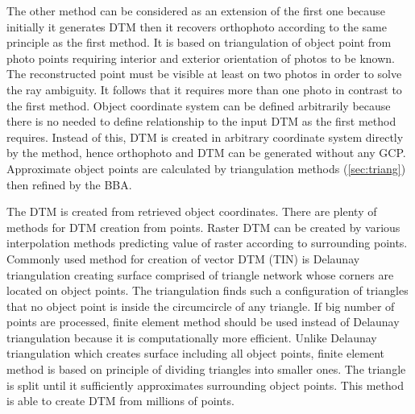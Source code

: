 \documentclass[a4paper,12pt]{article}
\begin{document}

The other method can be considered as an extension of the first one because initially it generates DTM then it recovers orthophoto 
according to the same principle as the first method. It is based on triangulation of object point
from photo points requiring interior and exterior orientation of photos to be known. The reconstructed point 
must be visible at least on two photos in order to solve the ray ambiguity. It follows that it requires more than 
one photo in contrast to the first method.
Object coordinate system 
can be defined arbitrarily because there is no needed to define relationship to the input DTM as the first method requires.
Instead of this, DTM is created in arbitrary coordinate system directly by the method,
hence orthophoto and DTM can be generated without any GCP. 
Approximate object points  are calculated by triangulation 
methods (\ref{sec:triang}) then refined by the BBA. 

The DTM is created from retrieved object coordinates. There 
are plenty of methods for DTM creation from points. Raster DTM can be created by various interpolation methods 
predicting value of raster according to surrounding points. Commonly used method for  creation of 
vector DTM (TIN) is Delaunay triangulation creating surface comprised of triangle network whose corners are located 
on object points. The triangulation finds such a configuration of triangles that no object 
point is inside the circumcircle of any triangle.
If big number of points are processed, finite element method 
should be used instead of Delaunay triangulation because it is computationally more efficient.
Unlike Delaunay triangulation which creates surface including all object points, finite element method
is based on principle of dividing triangles into smaller ones. 
The triangle is split until it sufficiently approximates surrounding object points. 
This method is able to create DTM from millions of points.
\end{document}

